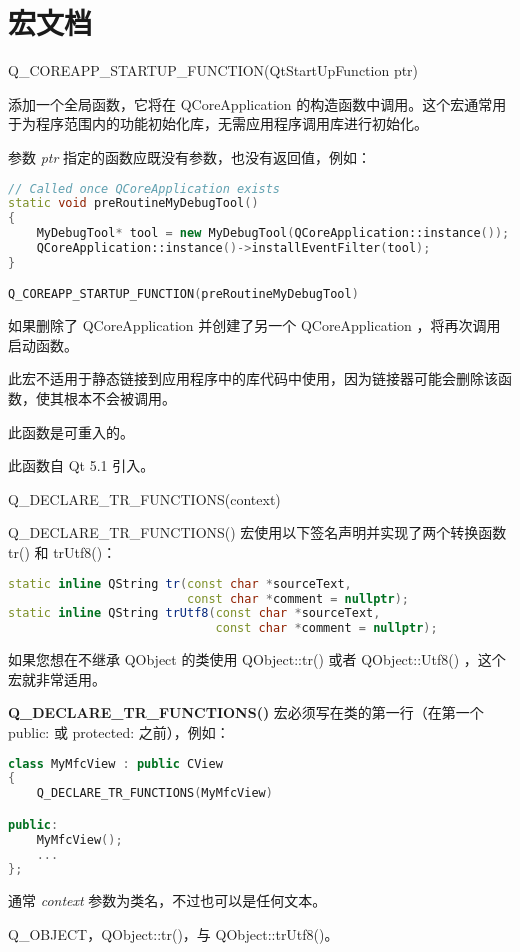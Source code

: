 \splitLine

\section{宏文档}

Q\_COREAPP\_STARTUP\_FUNCTION(QtStartUpFunction ptr)

添加一个全局函数，它将在 QCoreApplication 的构造函数中调用。这个宏通常用于为程序范围内的功能初始化库，无需应用程序调用库进行初始化。

参数 \emph{ptr} 指定的函数应既没有参数，也没有返回值，例如：


\begin{lstlisting}[language=C++]
// Called once QCoreApplication exists
static void preRoutineMyDebugTool()
{
    MyDebugTool* tool = new MyDebugTool(QCoreApplication::instance());
    QCoreApplication::instance()->installEventFilter(tool);
}

Q_COREAPP_STARTUP_FUNCTION(preRoutineMyDebugTool)
\end{lstlisting}



 

如果删除了 QCoreApplication 并创建了另一个 QCoreApplication ，将再次调用启动函数。

 
\begin{notice}
此宏不适用于静态链接到应用程序中的库代码中使用，因为链接器可能会删除该函数，使其根本不会被调用。
\end{notice}


\begin{notice}
 此函数是可重入的。
\end{notice}


此函数自 Qt 5.1 引入。

\splitLine

Q\_DECLARE\_TR\_FUNCTIONS(context)

Q\_DECLARE\_TR\_FUNCTIONS() 宏使用以下签名声明并实现了两个转换函数 tr() 和 trUtf8()：

\begin{lstlisting}[language=C++]
static inline QString tr(const char *sourceText,
                         const char *comment = nullptr);
static inline QString trUtf8(const char *sourceText,
                             const char *comment = nullptr);
\end{lstlisting}

如果您想在不继承 QObject 的类使用 QObject::tr() 或者 QObject::Utf8() ，这个宏就非常适用。

\textbf{Q\_DECLARE\_TR\_FUNCTIONS()} 宏必须写在类的第一行（在第一个 public: 或
protected: 之前），例如：

\begin{lstlisting}[language=C++]
class MyMfcView : public CView
{
    Q_DECLARE_TR_FUNCTIONS(MyMfcView)

public:
    MyMfcView();
    ...
};
\end{lstlisting}

通常 \emph{context} 参数为类名，不过也可以是任何文本。

\begin{notice}[另请参阅]
	Q\_OBJECT，QObject::tr()，与 QObject::trUtf8()。
\end{notice}
